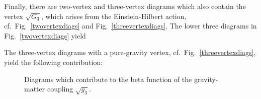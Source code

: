 \documentclass[11pt]{book} %
\newcommand{\bea}{\begin{eqnarray}}
\newcommand{\eea}{\end{eqnarray}}
\numberwithin{equation}{chapter}
\begin{document}
Finally, there are two-vertex and three-vertex diagrams which also contain the vertex $\sqrt{G_3}$,
which arises from the Einstein-Hilbert action, cf.~Fig.~\ref{twovertexdiags}
and Fig.~\ref{threevertexdiags}.
The lower three diagrams in Fig.~\ref{twovertexdiags} yield


The three-vertex diagrams with a pure-gravity vertex, cf.~Fig.~\ref{threevertexdiags},
yield the following contribution:



\begin{figure}[p]
  \begin{center}
    
  \end{center}
  \caption{
    Diagrams which contribute to the beta function of the gravity-matter coupling
    $\sqrt{g_3}$.
  }
  \label{fig:coupling-diagrams-ch4}
\end{figure}
\end{document}
